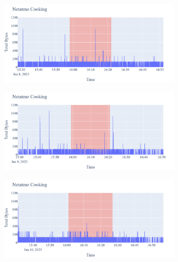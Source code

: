\begin{figure}[H]
    \begin{subfigure}[b]{0.5\textwidth}
        \centering
        \includegraphics[width=1.2\hsize]{figures/Netatmo_Cooking_Bytes_08.01.png}
    \end{subfigure}
    \begin{subfigure}[b]{0.5\textwidth}
        \centering
        \includegraphics[width=1.2\hsize]{figures/Netatmo_Cooking_Bytes_09.01.png}
    \end{subfigure}
    \begin{subfigure}[b]{0.5\textwidth}
        \centering
        \includegraphics[width=1.2\hsize]{figures/Netatmo_Cooking_Bytes_10.01.png}
    \end{subfigure}
    \begin{subfigure}[b]{0.5\textwidth}

\end{subfigure}
\end{figure}
